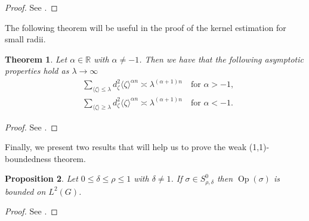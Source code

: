 \documentclass[12pt, reqno]{amsart}
\newtheorem{theorem}{Theorem}[section]
\newtheorem{proposition}[theorem]{Proposition}
\theoremstyle{definition}
\theoremstyle{remark}
\numberwithin{equation}{section}
\begin{document}
\begin{proof}
    See \cite[Proposition 6.7]{12}. 
\end{proof}
The following theorem will be useful in the proof of the kernel estimation for small radii. 
\begin{theorem}\label{Weyl}
    Let $\alpha\in\mathbb{R}$ with $\alpha\neq-1$. Then we have that the following asymptotic properties hold as $\lambda\to\infty$
    \begin{equation*}
    \begin{aligned}
        &\sum_{\langle\zeta\rangle\leq\lambda}d_\zeta^2\langle\zeta\rangle^{\alpha n}\asymp\lambda^{(\alpha+1)n}\quad\mathrm{for}\,\,\alpha>-1,\\
        &\sum_{\langle\zeta\rangle\geq\lambda}d_\zeta^2\langle\zeta\rangle^{\alpha n}\asymp\lambda^{(\alpha+1)n}\quad\mathrm{for}\,\,\alpha<-1.
    \end{aligned}
    \end{equation*}
\end{theorem}
\begin{proof}
    See \cite[Section 5]{Weyl}. 
\end{proof}
Finally, we present two results that will help us to prove the weak (1,1)-boundedness theorem. 
\begin{proposition}\label{L2}
    Let $0 \leq\delta\leq\rho\leq 1$ with $\delta\neq 1$. If $\sigma\in S^0_{\rho,\delta}$ then $\operatorname{Op}(\sigma)$ is bounded on $L^2(G)$.
\end{proposition}
\begin{proof}
    See \cite[Proposition 8.1]{12}.
\end{proof}
\end{document}
